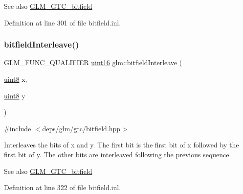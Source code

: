 \begin{DoxySeeAlso}{See also}
\hyperlink{group__gtc__bitfield}{G\+L\+M\+\_\+\+G\+T\+C\+\_\+bitfield} 
\end{DoxySeeAlso}


Definition at line 301 of file bitfield.\+inl.

\mbox{\label{group__gtc__bitfield_ga0700a3ceb088a0ecc23d76c154096061}} 
\subsubsection{\texorpdfstring{bitfield\+Interleave()}{bitfieldInterleave()}\hspace{0.1cm}{\footnotesize\ttfamily [2/16]}}
{\footnotesize\ttfamily G\+L\+M\+\_\+\+F\+U\+N\+C\+\_\+\+Q\+U\+A\+L\+I\+F\+I\+ER \hyperlink{group__gtc__type__precision_gad8c2939e1fdd8e5828b31d95c52255d5}{uint16} glm\+::bitfield\+Interleave (\begin{DoxyParamCaption}\item[{\hyperlink{group__gtc__type__precision_ga1a7dcd8aac97cc8020817c94049deff2}{uint8}}]{x,  }\item[{\hyperlink{group__gtc__type__precision_ga1a7dcd8aac97cc8020817c94049deff2}{uint8}}]{y }\end{DoxyParamCaption})}



{\ttfamily \#include $<$\hyperlink{bitfield_8hpp}{deps/glm/gtc/bitfield.\+hpp}$>$}

Interleaves the bits of x and y. The first bit is the first bit of x followed by the first bit of y. The other bits are interleaved following the previous sequence.

\begin{DoxySeeAlso}{See also}
\hyperlink{group__gtc__bitfield}{G\+L\+M\+\_\+\+G\+T\+C\+\_\+bitfield} 
\end{DoxySeeAlso}


Definition at line 322 of file bitfield.\+inl.

\mbox{\label{group__gtc__bitfield_ga1a0264598647ae00a596865af4e1e878}} 
